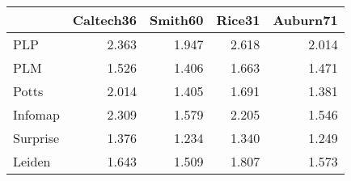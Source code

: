 \begin{tabular}{lrrrr}
\toprule
{} & Caltech36 & Smith60 & Rice31 & Auburn71 \\
\midrule
PLP      &     2.363 &   1.947 &  2.618 &    2.014 \\
PLM      &     1.526 &   1.406 &  1.663 &    1.471 \\
Potts    &     2.014 &   1.405 &  1.691 &    1.381 \\
Infomap  &     2.309 &   1.579 &  2.205 &    1.546 \\
Surprise &     1.376 &   1.234 &  1.340 &    1.249 \\
Leiden   &     1.643 &   1.509 &  1.807 &    1.573 \\
\bottomrule
\end{tabular}
